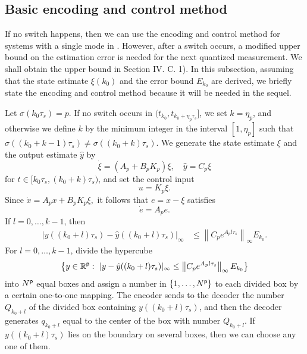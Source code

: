 \documentclass[letterpaper, 11pt, onecolumn]{ieeeconf}  \IEEEoverridecommandlockouts
\begin{document}
\subsection{Basic encoding and control method}
If no switch happens, then
we can use the encoding and control method
for systems with a single mode in \cite{Liberzon2003}.
However, after a switch occurs, a modified upper bound on 
the estimation error is needed for the next quantized measurement.
We shall obtain the upper bound in 
Section IV. C. 1).
In this subsection, assuming that the state estimate $\xi(k_0)$ and
the error bound $E_{k_0}$
are derived, we
briefly state the encoding and control method 
because it will be needed in the sequel.

Let $\sigma(k_0\tau_s) = p$.
If no switch occurs in $(t_{k_0}, t_{k_0+\eta_p \tau_s}]$,
we set $k=\eta_p$, and otherwise we define $k$
by the minimum integer in the interval $[1,\eta_p]$ such that 
$\sigma((k_0+k-1)\tau_s) \not= \sigma((k_0+k)\tau_s)$.
We generate the state estimate $\xi$ and the output estimate $\hat y$ by
\begin{equation}
\label{eq:xi_deq}
\dot \xi = (A_p + B_p K_p)\xi,\quad
\hat y = C_p \xi
\end{equation}
for $t \in [k_0\tau_s, (k_0+k) \tau_s)$, and set
the control input 
\begin{equation}
\label{eq:u_def}
u = K_p\xi.
\end{equation}
Since
$
\dot x 
= A_p x + B_p K_p \xi,
$
it follows that $e = x - \xi$ satisfies
\begin{equation}
\label{eq:e_deq}
\dot e = A_p e.
\end{equation}
If $l=0,\dots,k-1$, then
\begin{align*}
| y((k_0+l)\tau_s) - \hat y((k_0+l)\tau_s) |_{\infty}
&\leq \left\|C_p e^{A_p l \tau_s} \right\|_{\infty}
E_{k_0}.
\end{align*}
For $l=0,\dots,k-1$,
divide the hypercube 
\begin{equation}
\label{eq:quantization}
\left\{ y \in \mathbb{R}^{\sf p}:~| y  - \hat y((k_0+l)\tau_s)|_{\infty} 
\leq \left\|C_p e^{A_p l \tau_s} \right\|_{\infty}
E_{k_0} \right\}
\end{equation}
into $N^{\sf p}$ equal boxes and assign a number in $\{1,\dots, N^{\sf p}\}$
to each divided box by a certain one-to-one mapping.
The encoder sends to the decoder 
the number $Q_{k_0+l}$ of the divided box containing 
$y((k_0+l)\tau_s)$, and then
the decoder generates $q_{k_0+l}$ equal to the center of the box
with number $Q_{k_0+l}$.
If $y((k_0+l)\tau_s)$ lies on the boundary on several boxes, then
we can choose any one of them.
\end{document}
